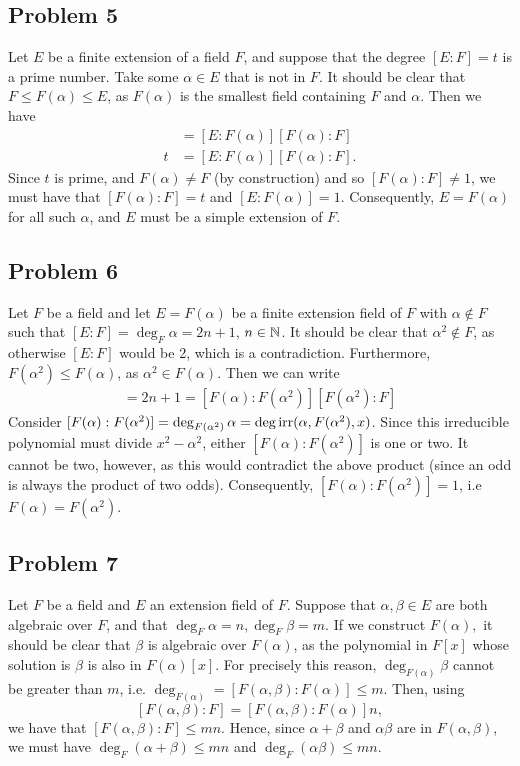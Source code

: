 \documentclass{../../mathnotes}
\begin{document}
\subsection*{Problem 5}

Let $E$ be a finite extension of a field $F$, and suppose that the degree $[E:F]=t$ is a prime number. Take some
$\alpha\in E$ that is not in $F$. It should be clear that $F\leq F(\alpha)\leq E$, as $F(\alpha)$ is the smallest
field containing $F$ and $\alpha$. Then we have
\begin{align*}
    [E:F]&=[E:F(\alpha)][F(\alpha):F]\\
    t&=[E:F(\alpha)][F(\alpha):F].
\end{align*}
Since $t$ is prime, and $F(\alpha)\neq F$ (by construction) and so $[F(\alpha):F]\neq1$, we must have that
$[F(\alpha):F]=t$ and $[E:F(\alpha)]=1$. Consequently, $E=F(\alpha)$ for all such $\alpha$, and $E$ must be a simple
extension of $F$.

\subsection*{Problem 6}

Let $F$ be a field and let $E=F(\alpha)$ be a finite extension field of $F$ with $\alpha\notin F$ such that $[E:F]=\deg_F\alpha=2n+1$,
$n\in\mathbb{N}$. It should be clear that $\alpha^2\notin F$, as otherwise $[E:F]$ would be 2, which is a contradiction. Furthermore,
$F(\alpha^2)\leq F(\alpha)$, as $\alpha^2\in F(\alpha)$. Then we can write
\begin{align*}
    [F(\alpha):F]=2n+1=[F(\alpha):F(\alpha^2)][F(\alpha^2):F]
\end{align*}
Consider $[F(\alpha):F(\alpha^2)]=\deg_{F(\alpha^2)}\alpha=\deg\operatorname{irr}(\alpha,F(\alpha^2),x)$. Since this irreducible
polynomial must divide $x^2-\alpha^2$, either $[F(\alpha):F(\alpha^2)]$ is one or two. It cannot be two, however, as
this would contradict the above product (since an odd is always the product of two odds). Consequently, $[F(\alpha):F(\alpha^2)]=1$,
i.e $F(\alpha)=F(\alpha^2)$.


\subsection*{Problem 7}

Let $F$ be a field and $E$ an extension field of $F$. Suppose that $\alpha,\beta\in E$ are both algebraic over $F$,
and that $\deg_F\alpha=n,\deg_F\beta=m$. If we construct $F(\alpha),$ it should be clear that $\beta$ is algebraic
over $F(\alpha)$, as the polynomial in $F[x]$ whose solution is $\beta$ is also in $F(\alpha)[x]$. For precisely
this reason, $\deg_{F(\alpha)}\beta$ cannot be greater than $m$, i.e. $\deg_{F(\alpha)}=[F(\alpha,\beta):F(\alpha)]\leq m$. Then, using
\[ [F(\alpha,\beta):F]=[F(\alpha,\beta):F(\alpha)]n,\]
we have that $[F(\alpha,\beta):F]\leq mn$. Hence, since $\alpha+\beta$ and $\alpha\beta$ are in $F(\alpha,\beta)$,
we must have $\deg_F(\alpha+\beta)\leq mn$ and $\deg_F(\alpha\beta)\leq mn$.
\end{document}
